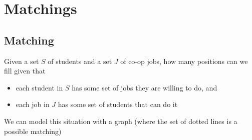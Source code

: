 \chapter{Matchings}
\section{Matching}
Given a set $ S $ of students and a set $ J $ of co-op jobs, how many positions
can we fill given that
\begin{itemize}
    \item each student in $ S $ has some set of jobs they are willing to do, and
    \item each job in $ J $ has some set of students that can do it
\end{itemize}
We can model this situation with a graph (where the set of dotted lines is a possible matching)
